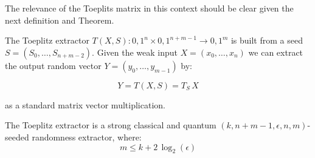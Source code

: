 The relevance of the Toeplits matrix in this context should be clear given the next definition and Theorem.

\begin{definition}
	The Toeplitz extractor $T(X, S) : {0,1}^n \times {0,1}^{n+m-1} \rightarrow {0,1}^{m}$ is built from a seed $S = (S_0, \dots, S_{n+m-2})$. Given the weak input $X = (x_0, \dots, x_n)$ we can extract the output random vector $Y = (y_0, \dots, y_{m-1})$ by:

	\begin{equation}
		Y = T(X,S) = T_S\,X
	\end{equation}

	as a standard matrix vector multiplication.
\end{definition}

\begin{theorem}
	The Toeplitz extractor is a strong classical and quantum $(k, n+m-1, \epsilon, n, m)$-seeded randomness extractor, where:
	\begin{equation}
		m \le k + 2\, \log_2(\epsilon)
	\end{equation}
\end{theorem}


